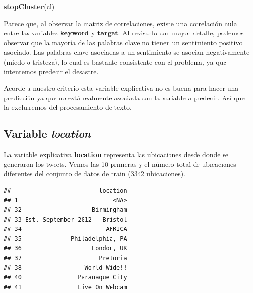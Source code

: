 \documentclass[]{article}
\newenvironment{Shaded}{\begin{snugshade}}{\end{snugshade}}
\newcommand{\DecValTok}[1]{\textcolor[rgb]{0.00,0.00,0.81}{#1}}
\newcommand{\KeywordTok}[1]{\textcolor[rgb]{0.13,0.29,0.53}{\textbf{#1}}}
\newcommand{\NormalTok}[1]{#1}
\newcommand{\OperatorTok}[1]{\textcolor[rgb]{0.81,0.36,0.00}{\textbf{#1}}}
\newcommand{\StringTok}[1]{\textcolor[rgb]{0.31,0.60,0.02}{#1}}
\begin{document}
\begin{Shaded}
\begin{Highlighting}[]
\KeywordTok{stopCluster}\NormalTok{(cl)}
\end{Highlighting}
\end{Shaded}

Parece que, al observar la matriz de correlaciones, existe una
correlación nula entre las variables \textbf{keyword} y \textbf{target}.
Al revisarlo con mayor detalle, podemos observar que la mayoría de las
palabras clave no tienen un sentimiento positivo asociado. Las palabras
clave asociadas a un sentimiento se asocian negativamente (miedo o
tristeza), lo cual es bastante consistente con el problema, ya que
intentemos predecir el desastre.

Acorde a nuestro criterio esta variable explicativa no es buena para
hacer una predicción ya que no está realmente asociada con la variable a
predecir. Así que la excluiremos del procesamiento de texto.

\hypertarget{variable-location}{%
\subsection{\texorpdfstring{Variable
\emph{location}}{Variable location}}\label{variable-location}}

La variable explicativa \textbf{location} representa las ubicaciones
desde donde se generaron los tweets. Vemos las 10 primeras y el número
total de ubicaciones diferentes del conjunto de datos de train (3342
ubicaciones).

\begin{Shaded}
\end{Shaded}

\begin{verbatim}
##                         location
## 1                           <NA>
## 32                    Birmingham
## 33 Est. September 2012 - Bristol
## 34                        AFRICA
## 35              Philadelphia, PA
## 36                    London, UK
## 37                      Pretoria
## 38                  World Wide!!
## 40                Paranaque City
## 41                Live On Webcam
\end{verbatim}
\end{document}
